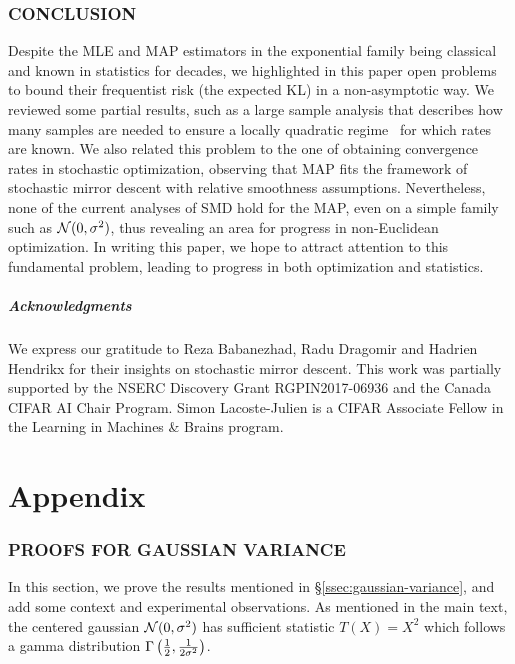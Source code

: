 \documentclass[twoside]{article}
\begin{document}
\section{CONCLUSION}
Despite the MLE and MAP estimators in the exponential family being classical and known in statistics for decades, we highlighted in this paper open problems to bound their frequentist risk (the expected KL) in a non-asymptotic way. We reviewed some partial results, such as a large sample analysis that describes how many samples are needed to ensure a locally quadratic regime~\citep{kakade2010learning, ostrovskii2021finite} for which rates are known. We also related this problem to the one of obtaining convergence rates in stochastic optimization, observing that MAP fits the framework of stochastic mirror descent with relative smoothness assumptions.
Nevertheless, none of the current analyses of SMD hold for the MAP, even on a simple family such as ${\mathcal N}(0,\sigma^2)$, thus revealing an area for progress in non-Euclidean optimization.
In writing this paper, we hope to attract attention to this fundamental problem, leading to progress in both optimization and statistics.

\subsubsection*{Acknowledgments}
We express our gratitude to Reza Babanezhad, Radu Dragomir and Hadrien Hendrikx for their insights on stochastic mirror descent. 
This work was partially supported by the NSERC Discovery Grant RGPIN2017-06936 and the Canada CIFAR AI Chair Program. 
Simon Lacoste-Julien is a CIFAR Associate Fellow in the Learning in Machines \& Brains program.






\clearpage
\appendix
\onecolumn


\part{Appendix} %
\parttoc %

\section{PROOFS FOR GAUSSIAN VARIANCE}
\label{app:gaussian-variance}


In this section, we prove the results mentioned in \S\ref{ssec:gaussian-variance},
and add some context and experimental observations.
As mentioned in the main text, the centered gaussian ${\mathcal N}(0,\sigma^2)$ has sufficient statistic $T(X)=X^2$ which follows a gamma distribution $\Gamma\left(\frac{1}{2}, \frac{1}{2 \sigma^2}\right)$. 
\end{document}
